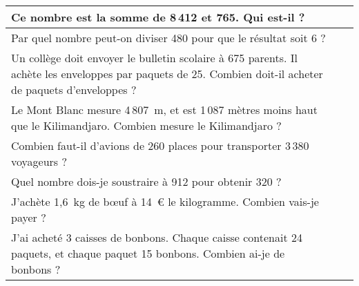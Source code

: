 \begin{tabular}{|m{13cm}|c|c|}
\hline
Ce nombre est la somme de 8\,412 et 765. Qui est-il ?&&\\
\hline
Par quel nombre peut-on diviser 480 pour que le résultat soit 6 ?&&\\
\hline
Un collège doit envoyer le bulletin scolaire à 675 parents. Il achète les enveloppes par paquets de 25. Combien doit-il acheter de paquets d'enveloppes ?&&\\
\hline
Le Mont Blanc mesure 4\,807~m, et est 1\,087 mètres moins haut que le Kilimandjaro. Combien mesure le Kilimandjaro ?&&\\
\hline
Combien faut-il d'avions de 260 places pour transporter 3\,380 voyageurs ?&&\\
\hline
Quel nombre dois-je soustraire à 912 pour obtenir 320 ?&&\\
\hline
J'achète 1,6~kg de b\oe uf à 14~\textgreek{\euro} le kilogramme. Combien vais-je payer ?&&\\
\hline
J'ai acheté 3 caisses de bonbons. Chaque caisse contenait 24 paquets, et chaque paquet 15 bonbons. Combien ai-je de bonbons ?&&\\
\hline
\end{tabular}